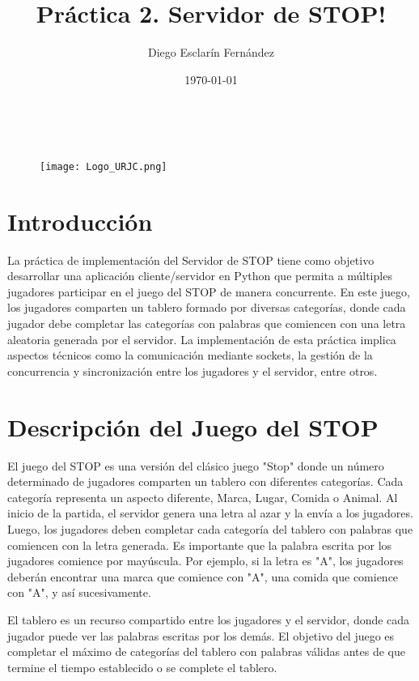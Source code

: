\documentclass{article}
\title{\Huge \textbf{Práctica 2. Servidor de STOP!}}
\author{Diego Esclarín Fernández}
\date{\today}
\begin{document}
\begin{titlepage}
    \maketitle
    \ 
    \begin{figure}[h]
        \centering
        \texttt{[image: Logo\_URJC.png]}
        \label{fig:ejemplo}
    \end{figure}
\end{titlepage}

\renewcommand{\contentsname}{Contenido}
\tableofcontents

\newpage

\section{Introducción}

La práctica de implementación del Servidor de STOP tiene como objetivo desarrollar una aplicación cliente/servidor en Python que permita a múltiples jugadores 
participar en el juego del STOP de manera concurrente. En este juego, los jugadores comparten un tablero formado por diversas categorías, donde cada jugador 
debe completar las categorías con palabras que comiencen con una letra aleatoria generada por el servidor. La implementación de esta práctica implica aspectos 
técnicos como la comunicación mediante sockets, la gestión de la concurrencia y sincronización entre los jugadores y el servidor, entre otros.


\section{Descripción del Juego del STOP}

El juego del STOP es una versión del clásico juego "Stop" donde un número determinado de jugadores comparten un tablero con diferentes categorías. 
Cada categoría representa un aspecto diferente, Marca, Lugar, Comida o Animal. Al inicio de la partida, el servidor genera una letra al azar y la envía 
a los jugadores. Luego, los jugadores deben completar cada categoría del tablero con palabras que comiencen con la letra generada. Es importante que la 
palabra escrita por los jugadores comience por mayúscula. Por ejemplo, si la letra es "A",
 los jugadores deberán encontrar una marca que comience con "A", una comida que comience con "A", y así sucesivamente.

El tablero es un recurso compartido entre los jugadores y el servidor, donde cada jugador puede ver las palabras escritas por los demás. 
El objetivo del juego es completar el máximo de categorías del tablero con palabras válidas antes de que termine el tiempo establecido o se complete el tablero.
\end{document}
